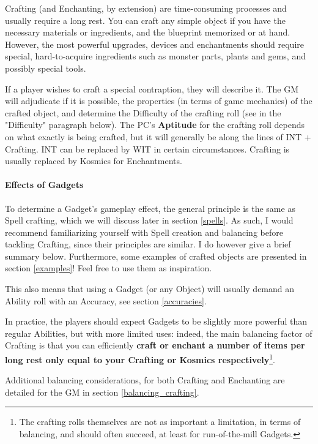 Crafting (and Enchanting, by extension) are time-consuming processes and usually require a long rest. You can craft any simple object if you have the necessary materials or ingredients, and the blueprint memorized or at hand. However, the most powerful upgrades, devices and enchantments should require special, hard-to-acquire ingredients such as monster parts, plants and gems, and possibly special tools. 

If a player wishes to craft a special contraption, they will describe it. The GM will adjudicate if it is possible, the properties (in terms of game mechanics) of the crafted object, and determine the Difficulty of the crafting roll (see in the "Difficulty" paragraph below). The PC's \textbf{Aptitude} for the crafting roll depends on what exactly is being crafted, but it will generally be along the lines of INT + Crafting. INT can be replaced by WIT in certain circumstances. Crafting is usually replaced by Kosmics for Enchantments.

\paragraph{Effects of Gadgets}

To determine a Gadget's gameplay effect, the general principle is the same as Spell crafting, which we will discuss later in section \ref{spells}. As such, I would recommend familiarizing yourself with Spell creation and balancing before tackling Crafting, since their principles are similar. I do however give a brief summary below. Furthermore, some examples of crafted objects are presented in section \ref{examples}! Feel free to use them as inspiration.

This also means that using a Gadget (or any Object) will usually demand an Ability roll with an Accuracy, see section \ref{accuracies}.

In practice, the players should expect Gadgets to be slightly more powerful than regular Abilities, but with more limited uses: indeed, the main balancing factor of Crafting is that you can efficiently \textbf{craft or enchant a number of items per long rest only equal to your Crafting or Kosmics respectively}\footnote{The crafting rolls themselves are not as important a limitation, in terms of balancing, and should often succeed, at least for run-of-the-mill Gadgets.}. 

Additional balancing considerations, for both Crafting and Enchanting are detailed for the GM in section \ref{balancing_crafting}.


